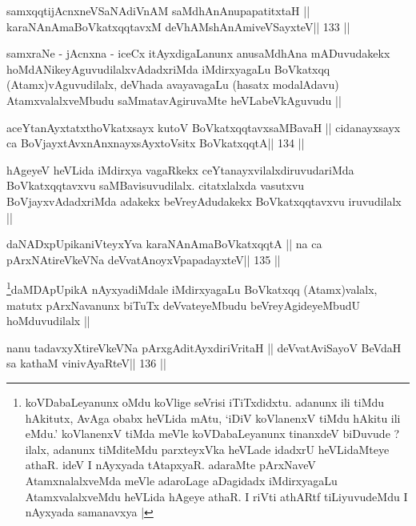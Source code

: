 
\begin{shl}
samxqqtijAcnxneVSaNAdiVnAM saMdhAnAnupapatitxtaH ||
karaNAnAmaBoVkatxqqtavxM deVhAMshAnAmiveVSayxteV\hfill || 133 ||
\end{shl}

\begin{artha}
samxraNe - jAcnxna - iceCx itAyxdigaLanunx anusaMdhAna mADuvudakekx hoMdANikeyAguvudilalxvAdadxriMda iMdirxyagaLu BoVkatxqq (Atamx)vAguvudilalx, deVhada avayavagaLu (hasatx modalAdavu) AtamxvalalxveMbudu saMmatavAgiruvaMte heVLabeVkAguvudu ||
\end{artha}

\begin{shl}
aceYtanAyxtatxthoVkatxsayx kutoV BoVkatxqqtavxsaMBavaH ||
cidanayxsayx ca BoVjayxtAvxnAnxnayxsAyxtoV\s sitx BoVkatxqqtA\hfill || 134 ||
\end{shl}

\begin{artha}
hAgeyeV heVLida iMdirxya vagaRkekx ceYtanayxvilalxdiruvudariMda 
BoVkatxqqtavxvu saMBavisuvudilalx. citatxlalxda vasutxvu BoVjayxvAdadxriMda adakekx beVreyAdudakekx BoVkatxqqtavxvu iruvudilalx ||
\end{artha}

\begin{shl}
daNADxpUpikaniVteyxYva karaNAnAmaBoVkatxqqtA ||
na ca pArxNAtireVkeVNa deVvatA\s noyxVpapadayxteV\hfill || 135 ||
\end{shl}

\begin{artha}
\footnote{koVDabaLeyanunx oMdu koVlige seVrisi iTiTxdidxtu. adanunx ili 
tiMdu hAkitutx, AvAga obabx heVLida mAtu, `iDiV koVlanenxV tiMdu hAkitu 
ili eMdu.' koVlanenxV tiMda meVle koVDabaLeyanunx tinanxdeV biDuvude ? 
ilalx, adanunx tiMditeMdu parxteyxVka heVLade idadxrU heVLidaMteye athaR. ideV I nAyxyada tAtapxyaR. adaraMte pArxNaveV AtamxnalalxveMda meVle adaroLage aDagidadx 
iMdirxyagaLu AtamxvalalxveMdu heVLida hAgeye athaR. I riVti athARtf tiLiyuvudeMdu I nAyxyada samanavxya |}daMDApUpikA nAyxyadiMdale iMdirxyagaLu BoVkatxqq (Atamx)valalx, matutx pArxNavanunx biTuTx deVvateyeMbudu beVreyAgideyeMbudU hoMduvudilalx ||
\end{artha}


\begin{shl}
nanu tadavxyXtireVkeVNa pArxgAditAyxdiriVritaH ||
deVvatAviSayoV BeVdaH sa kathaM vinivAyaRteV\hfill || 136 ||
\end{shl}

